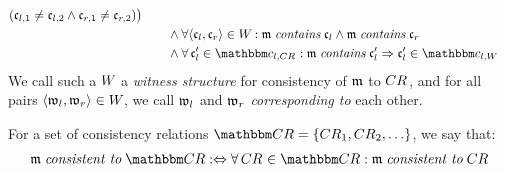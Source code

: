 \begin{definition}[Consistency]
\begin{align*}
        ( \conditionelement{c}{l,1} \neq \conditionelement{c}{l,2} \land \conditionelement{c}{r,1} \neq \conditionelement{c}{r,2}) \bigr) \\
        & \formulaskip\formulaskip
        \land \forall \tupled{\conditionelement{c}{l}, \conditionelement{c}{r}} \in  \consistencyrelation{W}{} : \modeltuple{m} \containsmath \conditionelement{c}{l} \land \modeltuple{m} \containsmath \conditionelement{c}{r} \\
        & \formulaskip\formulaskip
        \land \forall \conditionelement{c}{l}' \in \condition{c}{l,\consistencyrelation{CR}{}} : \modeltuple{m} \containsmath \conditionelement{c}{l}' \Rightarrow \conditionelement{c}{l}' \in \condition{c}{l,\consistencyrelation{W}{}}
    \end{align*}
    We call such a $\consistencyrelation{W}{}$ a \emph{witness structure} for consistency of $\modeltuple{m}$ to $\consistencyrelation{CR}{}$, and for all pairs $\tupled{\conditionelement{w}{l}, \conditionelement{w}{r}} \in \consistencyrelation{W}{}$, we call $\conditionelement{w}{l}$ and $\conditionelement{w}{r}$ \emph{corresponding to} each other.
    
    For a set of consistency relations $\consistencyrelationset{CR} = \setted{\consistencyrelation{CR}{1}, \consistencyrelation{CR}{2}, \dots}$, we say that:
    \begin{align*}
        \formulaskip &
        \modeltuple{m} \consistenttomath \consistencyrelationset{CR} \equivalentperdefinition %
        \forall \consistencyrelation{CR}{} \in \consistencyrelationset{CR} : \modeltuple{m} \consistenttomath \consistencyrelation{CR}{}
    \end{align*}
\end{definition}

